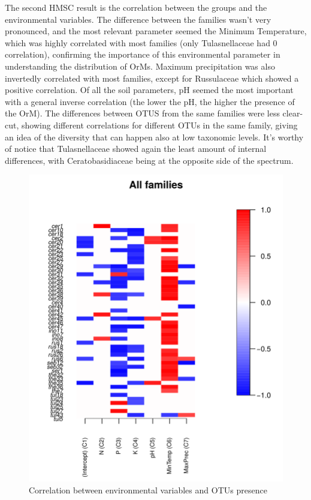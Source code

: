The second HMSC result is the correlation between the groups and the environmental variables.
The difference between the families wasn't very pronounced, and the most relevant parameter seemed the Minimum Temperature, which was highly correlated with most families (only Tulasnellaceae had 0 correlation), confirming the importance of this environmental parameter in understanding the distribution of OrMs. Maximum precipitation was also invertedly correlated with most families, except for Russulaceae which showed a positive correlation. Of all the soil parameters, pH seemed the most important with a general inverse correlation (the lower the pH, the higher the presence of the OrM).
The differences between OTUS from the same families were less clear-cut, showing different correlations for different OTUs in the same family, giving an idea of the diversity that can happen also at low taxonomic levels.
It's worthy of notice that Tulasnellaceae showed again the least amount of internal differences, with Ceratobasidiaceae being at the opposite side of the spectrum.

\begin{figure}[htbp]
\centering
\includegraphics[keepaspectratio,width=\textwidth,height=0.75\textheight]{images/envVar.png}
\caption{Correlation between environmental variables and OTUs presence}
\end{figure}

